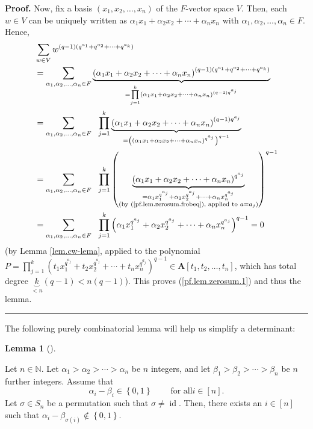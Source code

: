 \documentclass[numbers=enddot,12pt,final,onecolumn,notitlepage]{scrartcl}%
\numberwithin{exer}{section}
\theoremstyle{definition}
\newtheorem{lem}[theo]{Lemma}
\newenvironment{lemma}[1][]
{\begin{lem}[#1]\begin{leftbar}}
{\end{leftbar}\end{lem}}
\newenvironment{proof}[1][Proof]{\noindent\textbf{#1.} }{\ \rule{0.5em}{0.5em}}
\let\sumnonlimits\sum
\let\prodnonlimits\prod
\renewcommand{\sum}{\sumnonlimits\limits}
\renewcommand{\prod}{\prodnonlimits\limits}
\theoremstyle{plainsl}
\begin{document}
\begin{proof}
Now, fix a basis $\left(  x_{1},x_{2},\ldots,x_{n}\right)  $ of the $F$-vector
space $V$. Then, each $w\in V$ can be uniquely written as $\alpha_{1}%
x_{1}+\alpha_{2}x_{2}+\cdots+\alpha_{n}x_{n}$ with $\alpha_{1},\alpha
_{2},\ldots,\alpha_{n}\in F$. Hence,%
\begin{align*}
&  \sum_{w\in V}w^{\left(  q-1\right)  \left(  q^{a_{1}}+q^{a_{2}}%
+\cdots+q^{a_{k}}\right)  }\\
&  =\sum_{\alpha_{1},\alpha_{2},\ldots,\alpha_{n}\in F}\underbrace{\left(
\alpha_{1}x_{1}+\alpha_{2}x_{2}+\cdots+\alpha_{n}x_{n}\right)  ^{\left(
q-1\right)  \left(  q^{a_{1}}+q^{a_{2}}+\cdots+q^{a_{k}}\right)  }}%
_{=\prod_{j=1}^{k}\left(  \alpha_{1}x_{1}+\alpha_{2}x_{2}+\cdots+\alpha
_{n}x_{n}\right)  ^{\left(  q-1\right)  q^{a_{j}}}}\\
&  =\sum_{\alpha_{1},\alpha_{2},\ldots,\alpha_{n}\in F}\ \ \prod_{j=1}%
^{k}\underbrace{\left(  \alpha_{1}x_{1}+\alpha_{2}x_{2}+\cdots+\alpha_{n}%
x_{n}\right)  ^{\left(  q-1\right)  q^{a_{j}}}}_{=\left(  \left(  \alpha
_{1}x_{1}+\alpha_{2}x_{2}+\cdots+\alpha_{n}x_{n}\right)  ^{q^{a_{j}}}\right)
^{q-1}}\\
&  =\sum_{\alpha_{1},\alpha_{2},\ldots,\alpha_{n}\in F}\ \ \prod_{j=1}%
^{k}\left(  \underbrace{\left(  \alpha_{1}x_{1}+\alpha_{2}x_{2}+\cdots
+\alpha_{n}x_{n}\right)  ^{q^{a_{j}}}}_{\substack{=\alpha_{1}x_{1}^{q^{a_{j}}%
}+\alpha_{2}x_{2}^{q^{a_{j}}}+\cdots+\alpha_{n}x_{n}^{q^{a_{j}}}\\\text{(by
(\ref{pf.lem.zerosum.frobeq}), applied to }a=a_{j}\text{)}}}\right)  ^{q-1}\\
&  =\sum_{\alpha_{1},\alpha_{2},\ldots,\alpha_{n}\in F}\ \ \prod_{j=1}%
^{k}\left(  \alpha_{1}x_{1}^{q^{a_{j}}}+\alpha_{2}x_{2}^{q^{a_{j}}}%
+\cdots+\alpha_{n}x_{n}^{q^{a_{j}}}\right)  ^{q-1}=0
\end{align*}
(by Lemma \ref{lem.cw-lema}, applied to the polynomial $P=\prod_{j=1}%
^{k}\left(  t_{1}x_{1}^{q^{a_{j}}}+t_{2}x_{2}^{q^{a_{j}}}+\cdots+t_{n}%
x_{n}^{q^{a_{j}}}\right)  ^{q-1}\in\mathbf{A}\left[  t_{1},t_{2},\ldots
,t_{n}\right]  $, which has total degree $\underbrace{k}_{<n}\left(
q-1\right)  <n\left(  q-1\right)  $). This proves (\ref{pf.lem.zerosum.1}) and
thus the lemma.
\end{proof}

The following purely combinatorial lemma will help us simplify a determinant:

\begin{lemma}
\label{lem.perm}Let $n\in\mathbb{N}$. Let $\alpha_{1}>\alpha_{2}>\cdots
>\alpha_{n}$ be $n$ integers, and let $\beta_{1}>\beta_{2}>\cdots>\beta_{n}$
be $n$ further integers. Assume that%
\begin{equation}
\alpha_{i}-\beta_{i}\in\left\{  0,1\right\}  \ \ \ \ \ \ \ \ \ \ \text{for all
}i\in\left[  n\right]  . \label{eq.lem.perm.ass}%
\end{equation}
Let $\sigma\in S_{n}$ be a permutation such that $\sigma\neq\operatorname*{id}%
$. Then, there exists an $i\in\left[  n\right]  $ such that $\alpha_{i}%
-\beta_{\sigma\left(  i\right)  }\notin\left\{  0,1\right\}  $.
\end{lemma}
\end{document}

